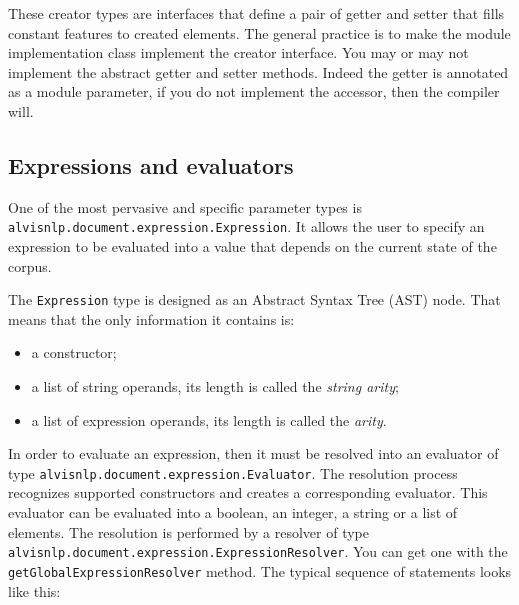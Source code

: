 \documentclass[a4paper]{article}
\begin{document}
These creator types are interfaces that define a pair of getter and setter that fills constant features to created elements.
The general practice is to make the module implementation class implement the creator interface.
You may or may not implement the abstract getter and setter methods.
Indeed the getter is annotated as a module parameter, if you do not implement the accessor, then the compiler will.

\subsection{Expressions and evaluators}
One of the most pervasive and specific parameter types is \texttt{alvisnlp.document.expression.Expression}.
It allows the user to specify an expression to be evaluated into a value that depends on the current state of the corpus.

The \texttt{Expression} type is designed as an Abstract Syntax Tree (AST) node.
That means that the only information it contains is:
\begin{itemize}
\item a constructor;
\item a list of string operands, its length is called the \emph{string arity};
\item a list of expression operands, its length is called the \emph{arity}.
\end{itemize}

In order to evaluate an expression, then it must be resolved into an evaluator of type \texttt{alvisnlp.document.expression.Evaluator}.
The resolution process recognizes supported constructors and creates a corresponding evaluator.
This evaluator can be evaluated into a boolean, an integer, a string or a list of elements.
The resolution is performed by a resolver of type \texttt{alvisnlp.document.expression.ExpressionResolver}.
You can get one with the \texttt{getGlobalExpressionResolver} method.
The typical sequence of statements looks like this:

\end{document}
